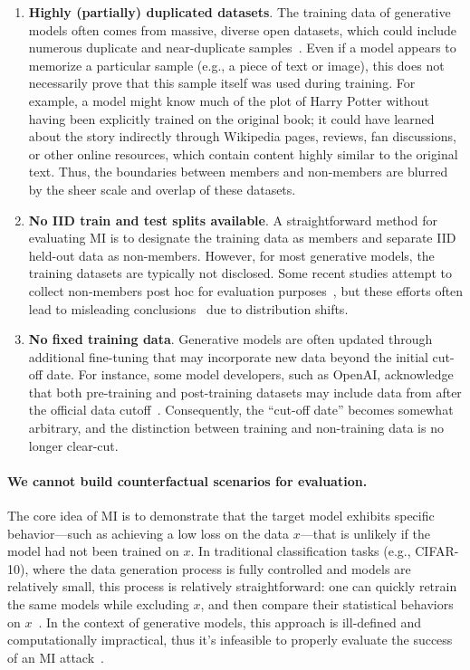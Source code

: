 \begin{enumerate}[leftmargin=10pt, topsep=0pt, itemsep=0pt]
    \item \textbf{Highly (partially) duplicated datasets}. The training data of generative models often comes from massive, diverse open datasets, which could include numerous duplicate and near-duplicate samples~\citep{lee2021deduplicating,tirumala2023d4}. Even if a model appears to memorize a particular sample (e.g., a piece of text or image), this does not necessarily prove that this sample itself was used during training. For example, a model might know much of the plot of Harry Potter without having been explicitly trained on the original book; it could have learned about the story indirectly through Wikipedia pages, reviews, fan discussions, or other online resources, which contain content highly similar to the original text. %
    Thus, the boundaries between members and non-members are blurred by the sheer scale and overlap of these datasets.
    
    \item \textbf{No IID train and test splits available}. A straightforward method for evaluating MI is to designate the training data as members and separate IID held-out data as non-members. However, for most generative models, the training datasets are typically not disclosed.%
    Some recent studies attempt to collect non-members post hoc for evaluation purposes~\citep{shi2023detecting,meeus2023did}, but these efforts often lead to misleading conclusions~\citep{duan2024membership,das2024blind} due to distribution shifts.
    
    \item \textbf{No fixed training data}. 
    Generative models are often updated through additional fine-tuning  that may incorporate new data beyond the initial cut-off date. For instance, some model developers, such as OpenAI, acknowledge that both pre-training and post-training datasets may include data from after the official data cutoff~\citep{achiam2023gpt}. Consequently, the ``cut-off date'' becomes somewhat arbitrary, and the distinction between training and non-training data is no longer clear-cut.
\end{enumerate}


\paragraph{We cannot build counterfactual scenarios for evaluation.} 
The core idea of MI is to demonstrate that the target model exhibits specific behavior---such as achieving a low loss on the data $x$---that is unlikely if the model had not been trained on $x$.  In traditional classification tasks (e.g., CIFAR-10), where the data generation process is fully controlled and models are relatively small, this process is relatively straightforward: one can quickly retrain the same models while excluding $x$, and then compare their statistical behaviors on $x$~\citep{carlini2022membership}. In the context of generative models, this approach is ill-defined and computationally impractical, thus it's infeasible to properly evaluate the success of an MI attack~\citep{zhang2024membership}.




